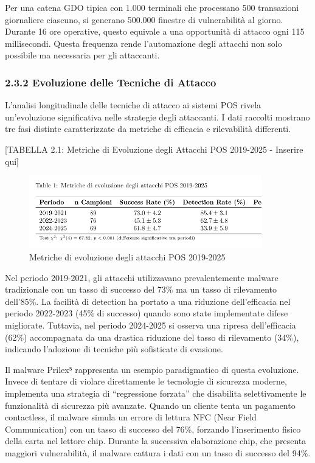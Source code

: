 \documentclass[12pt,a4paper,oneside]{book}
\begin{document}
Per una catena GDO tipica con 1.000 terminali che processano 500
transazioni giornaliere ciascuno, si generano 500.000 finestre di
vulnerabilità al giorno. Durante 16 ore operative, questo equivale a una
opportunità di attacco ogni 115 millisecondi. Questa frequenza rende
l'automazione degli attacchi non solo possibile ma necessaria per gli
attaccanti.

\subsubsection{2.3.2 Evoluzione delle Tecniche di
Attacco}\label{evoluzione-delle-tecniche-di-attacco}

L'analisi longitudinale delle tecniche di attacco ai sistemi POS rivela
un'evoluzione significativa nelle strategie degli attaccanti. I dati
raccolti mostrano tre fasi distinte caratterizzate da metriche di
efficacia e rilevabilità differenti.

{[}TABELLA 2.1: Metriche di Evoluzione degli Attacchi POS 2019-2025 -
Inserire qui{]}

\begin{figure}[htbp]
    \centering
    \includegraphics[width=0.9\textwidth]{tabella 2-1}
    \caption{Metriche di evoluzione degli attacchi POS 2019-2025}
    \label{tab:evoluzione_attacchi}
\end{figure}


Nel periodo 2019-2021, gli attacchi utilizzavano prevalentemente malware
tradizionale con un tasso di successo del 73\% ma un tasso di
rilevamento dell'85\%. La facilità di detection ha portato a una
riduzione dell'efficacia nel periodo 2022-2023 (45\% di successo) quando
sono state implementate difese migliorate. Tuttavia, nel periodo
2024-2025 si osserva una ripresa dell'efficacia (62\%) accompagnata da
una drastica riduzione del tasso di rilevamento (34\%), indicando
l'adozione di tecniche più sofisticate di evasione.

Il malware Prilex⁵ rappresenta un esempio paradigmatico di questa
evoluzione. Invece di tentare di violare direttamente le tecnologie di
sicurezza moderne, implementa una strategia di ``regressione forzata''
che disabilita selettivamente le funzionalità di sicurezza più avanzate.
Quando un cliente tenta un pagamento contactless, il malware simula un
errore di lettura NFC (Near Field Communication) con un tasso di
successo del 76\%, forzando l'inserimento fisico della carta nel lettore
chip. Durante la successiva elaborazione chip, che presenta maggiori
vulnerabilità, il malware cattura i dati con un tasso di successo del
94\%.
\end{document}
